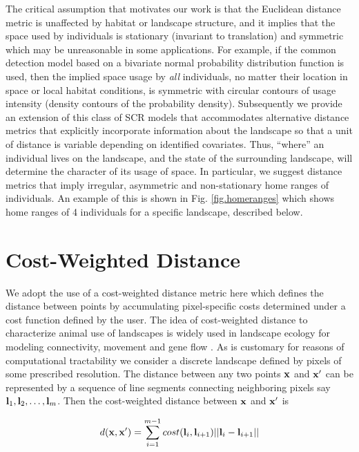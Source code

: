 \documentclass[12pt]{article}
\begin{document}
\begin{spacing}{1.8}
The critical assumption that motivates our work is that the Euclidean
distance metric is unaffected by habitat or landscape structure, and
it implies that the space used by individuals is stationary (invariant
to translation) and symmetric
which may be unreasonable in some applications.  For example, if the
common detection model based on a bivariate normal probability
distribution function is used, then the implied space usage by {\it
  all} individuals, no matter their location in space or local habitat
conditions, is symmetric with circular contours of usage intensity
(density contours of the probability density).  Subsequently we provide an extension
of this class of SCR models that accommodates alternative distance
metrics that explicitly incorporate information about the landscape so
that a unit of distance is variable depending on identified
covariates. Thus, ``where'' an individual lives on the landscape, and
the state of the surrounding landscape, will determine the character
of its usage of space. In particular, we suggest distance metrics that
imply irregular, asymmetric and non-stationary home ranges of
individuals. An example of this is shown in Fig. \ref{fig.homeranges}
which shows home ranges of 4 individuals for a specific landscape,
described below.



\section{Cost-Weighted Distance}

We adopt the use of a cost-weighted distance metric here which defines
the distance between points by accumulating pixel-specific costs
determined under a cost function defined by the user.  The idea of
cost-weighted distance to characterize animal use of landscapes is
widely used in landscape ecology for modeling connectivity, movement
and gene flow \citep{beier_etal:2008}. As is customary for reasons of
computational tractability we consider a discrete landscape defined by
pixels
of some prescribed resolution. The distance between any two
points ${\bf x}$ and ${\bf x}'$ can be represented by a sequence of
line segments connecting neighboring pixels say ${\bf l}_{1},{\bf
  l}_{2},\ldots,{\bf l}_{m}$. Then the cost-weighted distance between
${\bf x}$ and ${\bf x}'$ is

\begin{equation}
 d({\bf x},{\bf x}')
  =  \sum_{i=1}^{m-1} cost({\bf l}_{i},{\bf l}_{i+1})||{\bf l}_{i} - {\bf l}_{i+1}||
\label{eq.costweighted}
\end{equation}


\end{spacing}
\end{document}
